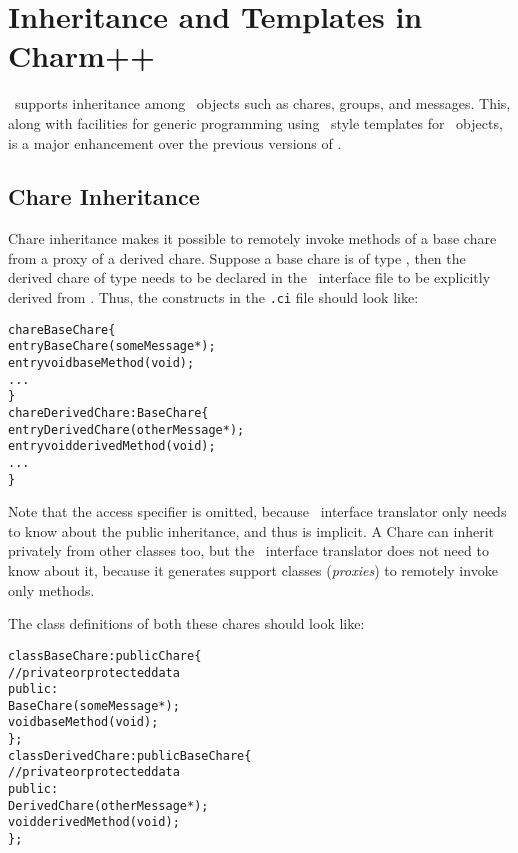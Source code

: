\section{Inheritance and Templates in Charm++}

\label{inheritance and templates}

\charmpp\ supports inheritance among \charmpp\ objects such as
chares, groups, and messages. This, along with facilities for generic
programming using \CC\ style templates for \charmpp\ objects, is a
major enhancement over the previous versions of \charmpp.

\subsection{Chare Inheritance}


Chare inheritance makes it possible to remotely invoke methods of a base
chare  from a proxy of a derived
chare. Suppose a base chare is of type 
, then the derived chare of type  needs to be
declared in the \charmpp\ interface file to be explicitly derived from
. Thus, the constructs in the \texttt{.ci} file should look like:

\begin{alltt}
  chare BaseChare \{
    entry BaseChare(someMessage *);
    entry void baseMethod(void);
    ...
  \}
  chare DerivedChare : BaseChare \{
    entry DerivedChare(otherMessage *);
    entry void derivedMethod(void);
    ...
  \}
\end{alltt}

Note that the access specifier  is omitted, because \charmpp\
interface translator only needs to know about the public inheritance,
and thus \kw{public} is implicit. A Chare can inherit privately from other
classes too, but the \charmpp\ interface translator does not need to know
about it, because it generates support classes ({\em proxies}) to remotely
invoke only \kw{public} methods.

The class definitions of both these chares should look like:

\begin{alltt}
  class BaseChare : public Chare \{
    // private or protected data
    public:
      BaseChare(someMessage *);
      void baseMethod(void);
  \};
  class DerivedChare : public BaseChare \{
    // private or protected data
    public:
      DerivedChare(otherMessage *);
      void derivedMethod(void);
  \};
\end{alltt}

